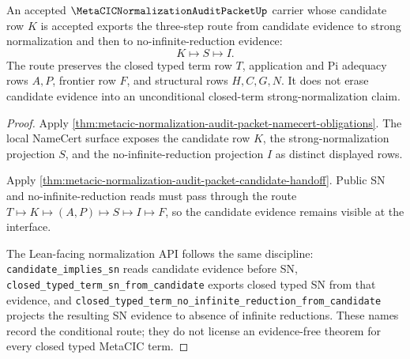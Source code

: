 \begin{theorem}
\label{thm:metacic-normalization-candidate-interface-composition}
An accepted $\MetaCICNormalizationAuditPacketUp$ carrier whose candidate row $K$ is accepted exports the three-step route from candidate evidence to strong normalization and then to no-infinite-reduction evidence:
$$
K \longmapsto S \longmapsto I .
$$
The route preserves the closed typed term row $T$, application and Pi adequacy rows $A,P$, frontier row $F$, and structural rows $H,C,G,N$. It does not erase candidate evidence into an unconditional closed-term strong-normalization claim.
\end{theorem}
\begin{proof}
Apply \autoref{thm:metacic-normalization-audit-packet-namecert-obligations}. The local NameCert surface exposes the candidate row $K$, the strong-normalization projection $S$, and the no-infinite-reduction projection $I$ as distinct displayed rows.

Apply \autoref{thm:metacic-normalization-audit-packet-candidate-handoff}. Public SN and no-infinite-reduction reads must pass through the route $T \longmapsto K \longmapsto (A,P) \longmapsto S \longmapsto I \longmapsto F$, so the candidate evidence remains visible at the interface.

The Lean-facing normalization API follows the same discipline: \texttt{candidate\_implies\_sn} reads candidate evidence before SN, \texttt{closed\_typed\_term\_sn\_from\_candidate} exports closed typed SN from that evidence, and \texttt{closed\_typed\_term\_no\_infinite\_reduction\_from\_candidate} projects the resulting SN evidence to absence of infinite reductions. These names record the conditional route; they do not license an evidence-free theorem for every closed typed MetaCIC term.
\end{proof}

